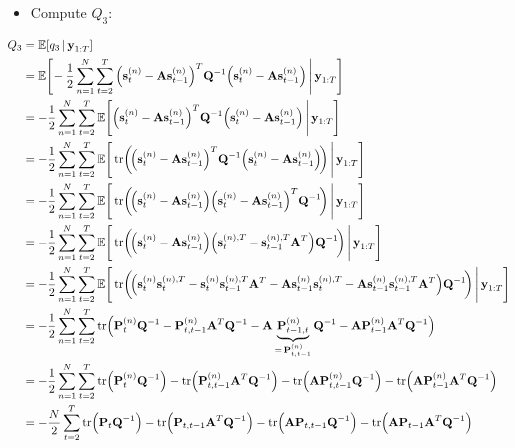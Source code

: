 		\begin{itemize}
			\item Compute \(Q_3\):
		\end{itemize}
		\begin{align*}  \allowdisplaybreaks
			Q_3
				&= \E[q_3 \given \vec{y}_{1:T}] \\
				&= \E\Bigg[\! -\frac{1}{2} \sum_{n = 1}^{N} \sum_{t = 2}^{T} \Big( \vec{s}_t^{(n)} - \mat{A} \vec{s}_{t - 1}^{(n)} \Big)^T \mat{Q}^{-1} \Big( \vec{s}_t^{(n)} - \mat{A} \vec{s}_{t - 1}^{(n)} \Big) \Bigggiven \vec{y}_{1:T} \Bigg] \\
				&= -\frac{1}{2} \sum_{n = 1}^{N} \sum_{t = 2}^{T} \E\Bigg[ \Big( \vec{s}_t^{(n)} - \mat{A} \vec{s}_{t - 1}^{(n)} \Big)^T \mat{Q}^{-1} \Big( \vec{s}_t^{(n)} - \mat{A} \vec{s}_{t - 1}^{(n)} \Big) \Bigggiven \vec{y}_{1:T} \Bigg] \\
				&= -\frac{1}{2} \sum_{n = 1}^{N} \sum_{t = 2}^{T} \E\Bigg[ \tr\!\bigg(\!\Big( \vec{s}_t^{(n)} - \mat{A} \vec{s}_{t - 1}^{(n)} \Big)^T \mat{Q}^{-1} \Big( \vec{s}_t^{(n)} - \mat{A} \vec{s}_{t - 1}^{(n)} \Big)\!\bigg) \Bigggiven \vec{y}_{1:T} \Bigg] \\
				&= -\frac{1}{2} \sum_{n = 1}^{N} \sum_{t = 2}^{T} \E\Bigg[ \tr\!\bigg(\!\Big( \vec{s}_t^{(n)} - \mat{A} \vec{s}_{t - 1}^{(n)} \Big) \Big( \vec{s}_t^{(n)} - \mat{A} \vec{s}_{t - 1}^{(n)} \Big)^T \mat{Q}^{-1} \!\bigg) \Bigggiven \vec{y}_{1:T} \Bigg] \\
				&= -\frac{1}{2} \sum_{n = 1}^{N} \sum_{t = 2}^{T} \E\Bigg[ \tr\!\bigg(\!\Big( \vec{s}_t^{(n)} - \mat{A} \vec{s}_{t - 1}^{(n)} \Big) \Big(\vec{s}_t^{(n), T} - \vec{s}_{t - 1}^{(n), T} \mat{A}^T \Big) \mat{Q}^{-1} \!\bigg) \Bigggiven \vec{y}_{1:T} \Bigg] \\
				&= -\frac{1}{2} \sum_{n = 1}^{N} \sum_{t = 2}^{T} \E\Bigg[ \tr\!\bigg(\!\Big( \vec{s}_t^{(n)} \vec{s}_t^{(n), T} - \vec{s}_t^{(n)} \vec{s}_{t - 1}^{(n), T} \mat{A}^T - \mat{A} \vec{s}_{t - 1}^{(n)} \vec{s}_t^{(n), T} - \mat{A} \vec{s}_{t - 1}^{(n)} \vec{s}_{t - 1}^{(n), T} \mat{A}^T \Big) \mat{Q}^{-1} \!\bigg) \Bigggiven \vec{y}_{1:T} \Bigg] \\
				&= -\frac{1}{2} \sum_{n = 1}^{N} \sum_{t = 2}^{T} \tr\!\Big( \mat{P}_t^{(n)} \mat{Q}^{-1} - \mat{P}_{t, t - 1}^{(n)} \mat{A}^T \mat{Q}^{-1} - \mat{A} \underbrace{\mat{P}_{t - 1, t}^{(n)}}_{=\, \mat{P}_{t, t - 1}^{(n)}} \mat{Q}^{-1} - \mat{A} \mat{P}_{t - 1}^{(n)} \mat{A}^T \mat{Q}^{-1} \Big) \\
				&= -\frac{1}{2} \sum_{n = 1}^{N} \sum_{t = 2}^{T} \tr\!\Big( \mat{P}_t^{(n)} \mat{Q}^{-1} \Big) - \tr\!\Big( \mat{P}_{t, t - 1}^{(n)} \mat{A}^T \mat{Q}^{-1} \Big) - \tr\!\Big( \mat{A} \mat{P}_{t, t - 1}^{(n)} \mat{Q}^{-1} \Big) - \tr\!\Big( \mat{A} \mat{P}_{t - 1}^{(n)} \mat{A}^T \mat{Q}^{-1} \Big) \\
				&= -\frac{N}{2} \sum_{t = 2}^{T} \tr\!\Big( \mat{P}_t \mat{Q}^{-1} \Big) - \tr\!\Big( \mat{P}_{t, t - 1} \mat{A}^T \mat{Q}^{-1} \Big) - \tr\!\Big( \mat{A} \mat{P}_{t, t - 1} \mat{Q}^{-1} \Big) - \tr\!\Big( \mat{A} \mat{P}_{t - 1} \mat{A}^T \mat{Q}^{-1} \Big)
		\end{align*}

